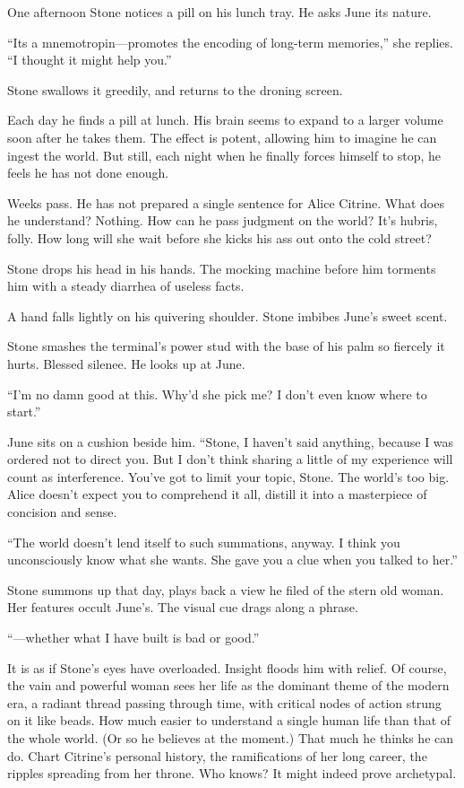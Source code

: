 One afternoon Stone notices a pill on his lunch tray. He asks June its nature.

``Its a mnemotropin---promotes the encoding of long-term memories,'' she replies. ``I thought it might help you.''

Stone swallows it greedily, and returns to the droning screen.

Each day he finds a pill at lunch. His brain seems to expand to a larger volume soon after he takes them. The effect is potent, allowing him to imagine he can ingest the world. But still, each night when he finally forces himself to stop, he feels he has not done enough.

Weeks pass. He has not prepared a single sentence for Alice Citrine. What does he understand? Nothing. How can he pass judgment on the world? It's hubris, folly. How long will she wait before she kicks his ass out onto the cold street?

Stone drops his head in his hands. The mocking machine before him torments him with a steady diarrhea of useless facts.

A hand falls lightly on his quivering shoulder. Stone imbibes June's sweet scent.

Stone smashes the terminal's power stud with the base of his palm so fiercely it hurts. Blessed silenee. He looks up at June.

``I'm no damn good at this. Why'd she pick me? I don't even know where to start.''

June sits on a cushion beside him. ``Stone, I haven't said anything, because I was ordered not to direct you. But I don't think sharing a little of my experience will count as interference. You've got to limit your topic, Stone. The world's too big. Alice doesn't expect you to comprehend it all, distill it into a masterpiece of concision and sense.

``The world doesn't lend itself to such summations, anyway. I think you unconsciously know what she wants. She gave you a clue when you talked to her.''

Stone summons up that day, plays back a view he filed of the stern old woman. Her features occult June's. The visual cue drags along a phrase.

``---whether what I have built is bad or good.''

It is as if Stone's eyes have overloaded. Insight floods him with relief. Of course, the vain and powerful woman sees her life as the dominant theme of the modern era, a radiant thread passing through time, with critical nodes of action strung on it like beads. How much easier to understand a single human life than that of the whole world. (Or so he believes at the moment.) That much he thinks he can do. Chart Citrine's personal history, the ramifications of her long career, the ripples spreading from her throne. Who knows? It might indeed prove archetypal.

